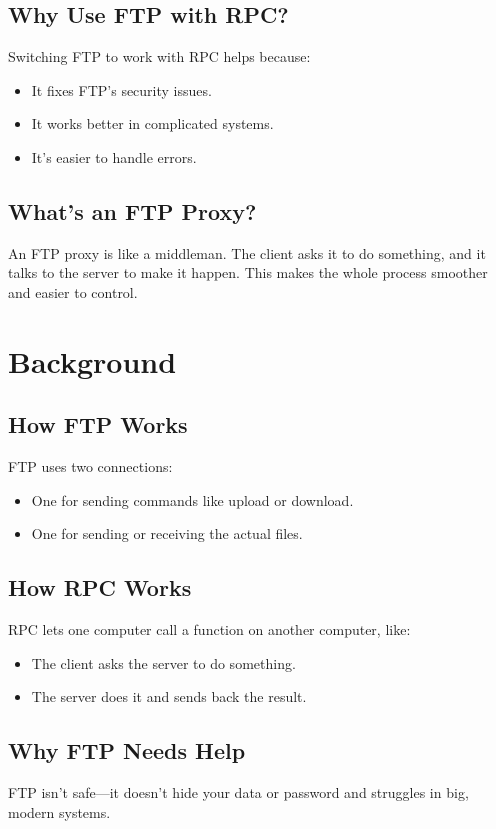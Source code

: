 \documentclass[a4paper,12pt]{article}
\begin{document}
\subsection{Why Use FTP with RPC?}
Switching FTP to work with RPC helps because:
\begin{itemize}
    \item It fixes FTP’s security issues.
    \item It works better in complicated systems.
    \item It’s easier to handle errors.
\end{itemize}

\subsection{What’s an FTP Proxy?}
An FTP proxy is like a middleman. The client asks it to do something, and it talks to the server to make it happen. This makes the whole process smoother and easier to control.

\section{Background}
\subsection{How FTP Works}
FTP uses two connections:
\begin{itemize}
    \item One for sending commands like upload or download.
    \item One for sending or receiving the actual files.
\end{itemize}

\subsection{How RPC Works}
RPC lets one computer call a function on another computer, like:
\begin{itemize}
    \item The client asks the server to do something.
    \item The server does it and sends back the result.
\end{itemize}

\subsection{Why FTP Needs Help}
FTP isn’t safe—it doesn’t hide your data or password and struggles in big, modern systems.
\end{document}
